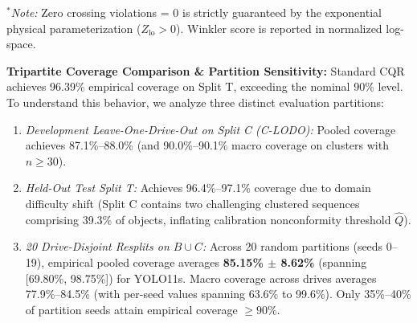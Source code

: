 \documentclass[]{spie}  %
\begin{document}
\begin{table}[htbp]
\centering
\caption{Conformal prediction benchmark on held-out test Split T (Nominal coverage: 90.0\%).}
\label{tab:conformal_benchmark_t}
\vskip 4pt
\parbox{\textwidth}{\footnotesize $^*$\textit{Note:} Zero crossing violations = 0 is strictly guaranteed by the exponential physical parameterization ($Z_{\text{lo}} > 0$). Winkler score is reported in normalized log-space.}
\end{table}

\textbf{Tripartite Coverage Comparison \& Partition Sensitivity:} Standard CQR achieves 96.39\% empirical coverage on Split T, exceeding the nominal 90\% level. To understand this behavior, we analyze three distinct evaluation partitions:
\begin{enumerate}
    \item \textit{Development Leave-One-Drive-Out on Split C (C-LODO):} Pooled coverage achieves 87.1\%--88.0\% (and 90.0\%--90.1\% macro coverage on clusters with $n \ge 30$).
    \item \textit{Held-Out Test Split T:} Achieves 96.4\%--97.1\% coverage due to domain difficulty shift (Split C contains two challenging clustered sequences comprising 39.3\% of objects, inflating calibration nonconformity threshold $\hat{Q}$).
    \item \textit{20 Drive-Disjoint Resplits on $B \cup C$:} Across 20 random partitions (seeds 0--19), empirical pooled coverage averages \textbf{85.15\% $\pm$ 8.62\%} (spanning [69.80\%, 98.75\%]) for YOLO11s. Macro coverage across drives averages 77.9\%--84.5\% (with per-seed values spanning 63.6\% to 99.6\%). Only 35\%--40\% of partition seeds attain empirical coverage $\ge 90\%$.
\end{enumerate}
\end{document}

